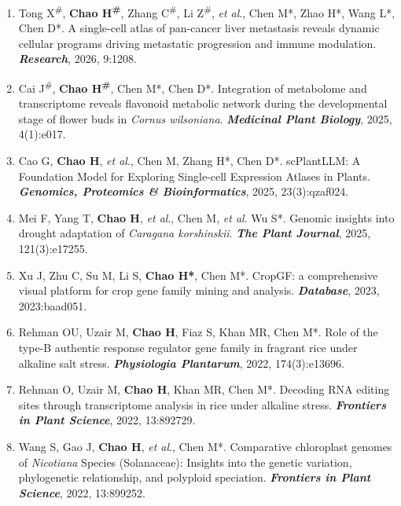 {\begin{enumerate}[leftmargin=*, itemsep=1pt, parsep=0pt, topsep=0pt]
    \item Tong X\textsuperscript{\#}, \textbf{Chao H\textsuperscript{\#}}, Zhang C\textsuperscript{\#}, Li Z\textsuperscript{\#}, \textit{et al}., Chen M*, Zhao H*, Wang L*, Chen D*. 
    A single-cell atlas of pan-cancer liver metastasis reveals dynamic cellular programs driving metastatic progression and immune modulation.
    \textbf{\textit{Research}}, 2026, 9:1208.
    
    \item Cai J\textsuperscript{\#}, \textbf{Chao H\textsuperscript{\#}}, Chen M*, Chen D*.
    Integration of metabolome and transcriptome reveals flavonoid metabolic network during the developmental stage of flower buds in \textit{Cornus wilsoniana}. 
    \textbf{\textit{Medicinal Plant Biology}}, 2025, 4(1):e017.

    \item Cao G, \textbf{Chao H}, \textit{et al}., Chen M, Zhang H*, Chen D*. 
    scPlantLLM: A Foundation Model for Exploring Single-cell Expression Atlases in Plants. 
    \textbf{\textit{Genomics, Proteomics \& Bioinformatics}}, 2025, 23(3):qzaf024.
    
    \item Mei F, Yang T, \textbf{Chao H}, \textit{et al}., Chen M, \textit{et al}. Wu S*. 
    Genomic insights into drought adaptation of \textit{Caragana korshinskii}. 
    \textbf{\textit{The Plant Journal}}, 2025, 121(3):e17255.

    \item Xu J, Zhu C, Su M, Li S, \textbf{Chao H*}, Chen M*. 
    CropGF: a comprehensive visual platform for crop gene family mining and analysis. 
    \textbf{\textit{Database}}, 2023, 2023:baad051.

    \item Rehman OU, Uzair M, \textbf{Chao H}, Fiaz S, Khan MR, Chen M*. 
    Role of the type-B authentic response regulator gene family in fragrant rice under alkaline salt stress. 
    \textbf{\textit{Physiologia Plantarum}}, 2022, 174(3):e13696.

    \item Rehman O, Uzair M, \textbf{Chao H}, Khan MR, Chen M*. 
    Decoding RNA editing sites through transcriptome analysis in rice under alkaline stress. 
    \textbf{\textit{Frontiers in Plant Science}}, 2022, 13:892729.

    \item Wang S, Gao J, \textbf{Chao H}, \textit{et al}., Chen M*. 
    Comparative chloroplast genomes of \textit{Nicotiana} Species (Solanaceae): Insights into the genetic variation, phylogenetic relationship, and polyploid speciation. 
    \textbf{\textit{Frontiers in Plant Science}}, 2022, 13:899252.


\end{enumerate}}

